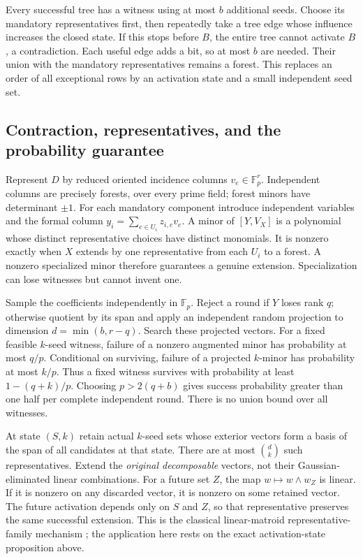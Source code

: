 Every successful tree has a witness using at most $b$ additional seeds.
Choose its mandatory representatives first, then repeatedly take a tree
edge whose influence increases the closed state.  If this stops before
$B$, the entire tree cannot activate $B$, a contradiction.  Each useful
edge adds a bit, so at most $b$ are needed.  Their union with the mandatory
representatives remains a forest.  This replaces an order of all
exceptional rows by an activation state and a small independent seed set.

\subsection{Contraction, representatives, and the probability guarantee}

Represent $D$ by reduced oriented incidence columns $v_e\in\mathbb F_p^r$.
Independent columns are precisely forests, over every prime field; forest
minors have determinant $\pm1$.  For each mandatory component introduce
independent variables and the formal column
$y_i=\sum_{e\in U_i}z_{i,e}v_e$.  A minor of $[Y,V_X]$ is a polynomial
whose distinct representative choices have distinct monomials.
It is nonzero exactly when $X$ extends by one representative from each
$U_i$ to a forest.  A nonzero specialized minor therefore guarantees a
genuine extension.  Specialization can lose witnesses but cannot invent
one.

Sample the coefficients independently in $\mathbb F_p$.  Reject a round
if $Y$ loses rank $q$; otherwise quotient by its span and apply an
independent random projection to dimension $d=\min(b,r-q)$.  Search these
projected vectors.  For a fixed feasible $k$-seed witness, failure of a
nonzero augmented minor has probability at most $q/p$.  Conditional on
surviving, failure of a projected $k$-minor has probability at most $k/p$.
Thus a fixed witness survives with probability at least $1-(q+k)/p$.
Choosing $p>2(q+b)$ gives success probability greater than one half per
complete independent round.  There is no union bound over all witnesses.

At state $(S,k)$ retain actual $k$-seed sets whose exterior vectors form
a basis of the span of all candidates at that state.  There are at most
$\binom dk$ such representatives.  Extend the \emph{original decomposable}
vectors, not their Gaussian-eliminated linear combinations.  For a future
set $Z$, the map $w\mapsto w\wedge w_Z$ is linear.  If it is nonzero on
any discarded vector, it is nonzero on some retained vector.  The future
activation depends only on $S$ and $Z$, so that representative preserves
the same successful extension.  This is the classical linear-matroid
representative-family mechanism \cite{activation-fomin}; the application
here rests on the exact activation-state proposition above.

